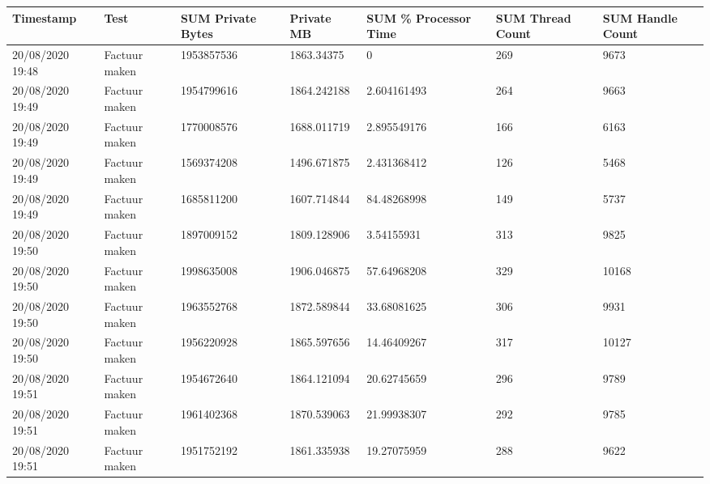 \begin{tiny}
\begin{longtable}{lllllll}
    Timestamp        & Test                  & SUM Private Bytes & Private MB  & SUM \% Processor Time & SUM Thread Count & SUM Handle Count \\
    \endhead
    20/08/2020 19:48 & Factuur maken         & 1953857536        & 1863.34375  & 0                     & 269              & 9673             \\
    20/08/2020 19:49 & Factuur maken         & 1954799616        & 1864.242188 & 2.604161493           & 264              & 9663             \\
    20/08/2020 19:49 & Factuur maken         & 1770008576        & 1688.011719 & 2.895549176           & 166              & 6163             \\
    20/08/2020 19:49 & Factuur maken         & 1569374208        & 1496.671875 & 2.431368412           & 126              & 5468             \\
    20/08/2020 19:49 & Factuur maken         & 1685811200        & 1607.714844 & 84.48268998           & 149              & 5737             \\
    20/08/2020 19:50 & Factuur maken         & 1897009152        & 1809.128906 & 3.54155931            & 313              & 9825             \\
    20/08/2020 19:50 & Factuur maken         & 1998635008        & 1906.046875 & 57.64968208           & 329              & 10168            \\
    20/08/2020 19:50 & Factuur maken         & 1963552768        & 1872.589844 & 33.68081625           & 306              & 9931             \\
    20/08/2020 19:50 & Factuur maken         & 1956220928        & 1865.597656 & 14.46409267           & 317              & 10127            \\
    20/08/2020 19:51 & Factuur maken         & 1954672640        & 1864.121094 & 20.62745659           & 296              & 9789             \\
    20/08/2020 19:51 & Factuur maken         & 1961402368        & 1870.539063 & 21.99938307           & 292              & 9785             \\
    20/08/2020 19:51 & Factuur maken         & 1951752192        & 1861.335938 & 19.27075959           & 288              & 9622             \\

\end{longtable}
\end{tiny}
